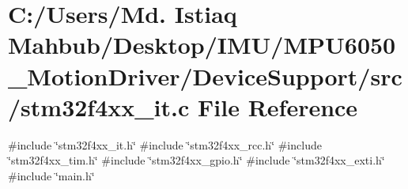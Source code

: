 \section{C\+:/\+Users/\+Md. Istiaq Mahbub/\+Desktop/\+I\+M\+U/\+M\+P\+U6050\+\_\+\+Motion\+Driver/\+Device\+Support/src/stm32f4xx\+\_\+it.c File Reference}
\label{stm32f4xx__it_8c}
{\ttfamily \#include \char`\"{}stm32f4xx\+\_\+it.\+h\char`\"{}}\newline
{\ttfamily \#include \char`\"{}stm32f4xx\+\_\+rcc.\+h\char`\"{}}\newline
{\ttfamily \#include \char`\"{}stm32f4xx\+\_\+tim.\+h\char`\"{}}\newline
{\ttfamily \#include \char`\"{}stm32f4xx\+\_\+gpio.\+h\char`\"{}}\newline
{\ttfamily \#include \char`\"{}stm32f4xx\+\_\+exti.\+h\char`\"{}}\newline
{\ttfamily \#include \char`\"{}main.\+h\char`\"{}}\newline
